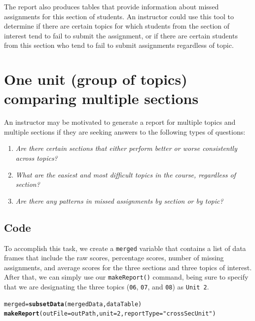 \documentclass[11pt,a4paper,oldfontcommands,openany]{memoir}
\makeatletter
\newcommand{\hlnum}[1]{\textcolor[rgb]{0.686,0.059,0.569}{#1}}%
\newcommand{\hlstr}[1]{\textcolor[rgb]{0.192,0.494,0.8}{#1}}%
\newcommand{\hlstd}[1]{\textcolor[rgb]{0.345,0.345,0.345}{#1}}%
\newcommand{\hlkwb}[1]{\textcolor[rgb]{0.69,0.353,0.396}{#1}}%
\newcommand{\hlkwc}[1]{\textcolor[rgb]{0.333,0.667,0.333}{#1}}%
\newcommand{\hlkwd}[1]{\textcolor[rgb]{0.737,0.353,0.396}{\textbf{#1}}}%
\newenvironment{kframe}{%
 \def\at@end@of@kframe{}%
 \ifinner\ifhmode%
  \def\at@end@of@kframe{\end{minipage}}%
  \begin{minipage}{\columnwidth}%
 \fi\fi%
 \def\FrameCommand##1{\hskip\@totalleftmargin \hskip-\fboxsep
 \colorbox{shadecolor}{##1}\hskip-\fboxsep
     \hskip-\linewidth \hskip-\@totalleftmargin \hskip\columnwidth}%
 \MakeFramed {\advance\hsize-\width
   \@totalleftmargin\z@ \linewidth\hsize
   \@setminipage}}%
 {\par\unskip\endMakeFramed%
 \at@end@of@kframe}
\newenvironment{knitrout}{}{} %
\numberwithin{equation}{section} %
\makeatother
\begin{document}
The report also produces tables that provide information about missed assignments for this section of students. An instructor could use this tool to determine if there are certain topics for which students from the section of interest tend to fail to submit the assignment, or if there are certain students from this section who tend to fail to submit assignments regardless of topic.

\section{One unit (group of topics) comparing multiple sections}

An instructor may be motivated to generate a report for multiple topics and multiple sections if they are seeking answers to the following types of questions:

\begin{enumerate}
\item \textit{Are there certain sections that either perform better or worse consistently across topics?}
\item \textit{What are the easiest and most difficult topics in the course, regardless of section?}
\item \textit{Are there any patterns in missed assignments by section or by topic?}
\end{enumerate}

\subsection{Code}
\label{sec:crossSecU}

To accomplish this task, we create a \texttt{merged} variable that contains a list of data frames that include the raw scores, percentage scores, number of missing assignments, and average scores for the three sections and three topics of interest. After that, we can simply use our \texttt{makeReport()} command, being sure to specify that we are designating the three topics (\texttt{06}, \texttt{07}, and \texttt{08}) as \texttt{Unit 2}. \\

\begin{knitrout}
\color{fgcolor}\begin{kframe}
\begin{alltt}
\hlstd{merged} \hlkwb{=} \hlkwd{subsetData}\hlstd{(mergedData, dataTable)}
\hlkwd{makeReport}\hlstd{(}\hlkwc{outFile} \hlstd{= outPath,} \hlkwc{unit} \hlstd{=} \hlnum{2}\hlstd{,} \hlkwc{reportType} \hlstd{=} \hlstr{"crossSecUnit"}\hlstd{)}
\end{alltt}
\end{kframe}
\end{knitrout}
\end{document}
